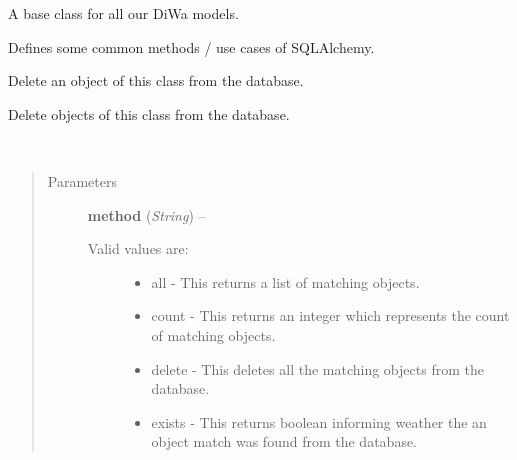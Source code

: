 \documentclass[letterpaper,10pt,english]{sphinxmanual}
\begin{document}
\begin{fulllineitems}
\label{modelsbase:modelsbase.MethodMixin}
A base class for all our DiWa models.

Defines some common methods / use cases of SQLAlchemy.

\begin{fulllineitems}
\label{modelsbase:modelsbase.MethodMixin.delete}
Delete an object of this class from the database.

\end{fulllineitems}


\begin{fulllineitems}
\label{modelsbase:modelsbase.MethodMixin.delete_many}
Delete objects of this class from the database.

\end{fulllineitems}


\begin{fulllineitems}
\label{modelsbase:modelsbase.MethodMixin.get}~\begin{quote}\begin{description}
\item[{Parameters}] \leavevmode
\textbf{method} (\emph{String}) -- \begin{description}
\item[{Valid values are:}] \leavevmode\begin{itemize}
\item {} 
all - This returns a list of matching objects.

\item {} 
count - This returns an integer which represents the count                of matching objects.

\item {} 
delete - This deletes all the matching objects from the                database.

\item {} 
exists - This returns boolean informing weather the an                object match was found from the database.


\end{itemize}
\end{description}
\end{description}
\end{quote}
\end{fulllineitems}
\end{fulllineitems}
\end{document}
